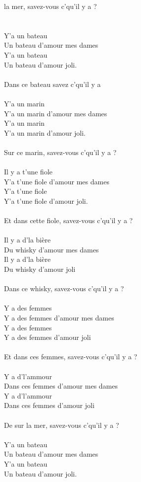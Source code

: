 
{} la mer, savez-vous c'qu'il y a ? \bissimple
\\\\\\Y'a un bateau
\\Un bateau d'amour mes dames
\\Y'a un bateau
\\Un bateau d'amour joli.
\\\\Dans ce bateau savez c'qu'il y a \bissimple
\\\\Y'a un marin
\\Y'a un marin d'amour mes dames
\\Y'a un marin
\\Y'a un marin d'amour joli.
\\\\Sur ce marin, savez-vous c'qu'il y a ? \bissimple
\\\\Il y a t'une fiole
\\Y'a t'une fiole d'amour mes dames
\\Y'a t'une fiole
\\Y'a t'une fiole d'amour joli.
\\\\Et dans cette fiole, savez-vous c'qu'il y a ? \bissimple
\\\\Il y a d'la bière
\\Du whisky d'amour mes dames
\\Il y a d'la bière
\\Du whisky d'amour joli
\\\\Dans ce whisky, savez-vous c'qu'il y a ? \bissimple
\\\\Y a des femmes
\\Y a des femmes d'amour mes dames
\\Y a des femmes
\\Y a des femmes d'amour joli
\\\\Et dans ces femmes, savez-vous c'qu'il y a ? \bissimple
\\\\Y a d'l'ammour
\\Dans ces femmes d'amour mes dames
\\Y a d'l'ammour
\\Dans ces femmes d'amour joli
\\\\De sur la mer, savez-vous c'qu'il y a ? \bissimple
\\\\Y'a un bateau
\\Un bateau d'amour mes dames
\\Y'a un bateau
\\Un bateau d'amour joli.

